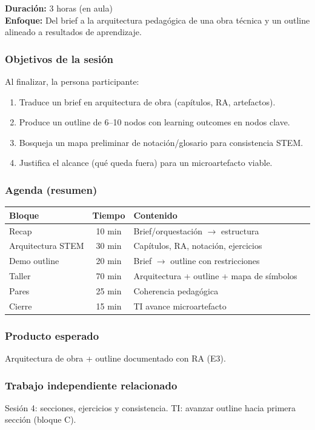 \textbf{Duración:} 3 horas (en aula)\\
\textbf{Enfoque:} Del brief a la arquitectura pedagógica de una obra técnica y un outline alineado a resultados de aprendizaje.

\subsubsection*{Objetivos de la sesión}
Al finalizar, la persona participante:
\begin{enumerate}
\item Traduce un brief en arquitectura de obra (capítulos, RA, artefactos).
\item Produce un outline de 6--10 nodos con learning outcomes en nodos clave.
\item Bosqueja un mapa preliminar de notación/glosario para consistencia STEM.
\item Justifica el alcance (qué queda fuera) para un microartefacto viable.
\end{enumerate}

\subsubsection*{Agenda (resumen)}
\begin{tabularx}{\textwidth}{@{}lclX@{}}
\toprule
Bloque & Tiempo & Contenido \\
\midrule
Recap & 10 min & Brief/orquestación $\rightarrow$ estructura \\
Arquitectura STEM & 30 min & Capítulos, RA, notación, ejercicios \\
Demo outline & 20 min & Brief $\rightarrow$ outline con restricciones \\
Taller & 70 min & Arquitectura + outline + mapa de símbolos \\
Pares & 25 min & Coherencia pedagógica \\
Cierre & 15 min & TI avance microartefacto \\
\bottomrule
\end{tabularx}

\subsubsection*{Producto esperado}
Arquitectura de obra + outline documentado con RA (E3).

\subsubsection*{Trabajo independiente relacionado}
Sesión 4: secciones, ejercicios y consistencia. TI: avanzar outline hacia primera sección (bloque C).
